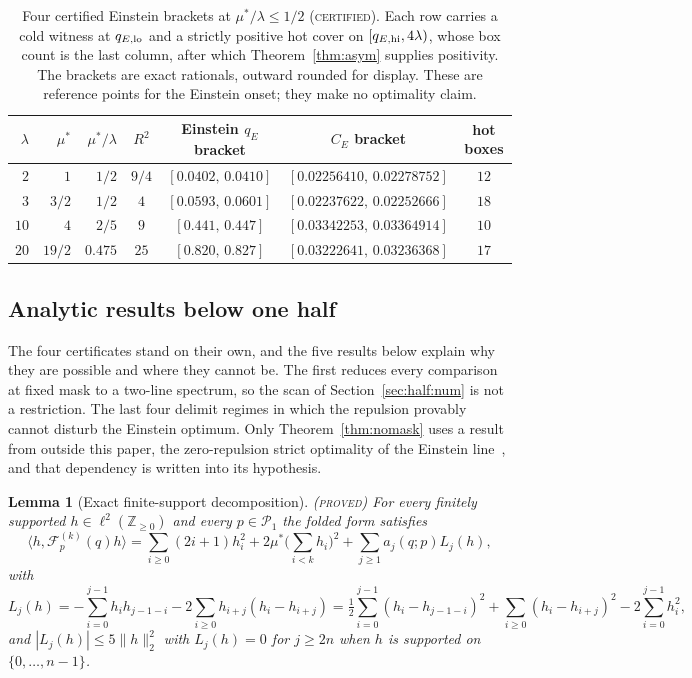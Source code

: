 \documentclass[11pt]{article}
\newcommand{\CE}{C_E}
\newcommand{\Fcal}{\mathcal F}
\newcommand{\muS}{\mu^{*}}
\newtheorem{lemma}[theorem]{Lemma}
\theoremstyle{definition}
\theoremstyle{remark}
\newcommand{\proved}{\textnormal{\textsc{(proved)}}}
\begin{document}
\begin{table}[t]
\centering
\footnotesize
\setlength{\tabcolsep}{5pt}
\renewcommand{\arraystretch}{1.15}
\begin{tabular}{@{}rrrcccc@{}}
\toprule
$\lambda$ & $\muS$ & $\muS/\lambda$ & $R^2$ & Einstein $q_E$ bracket & $\CE$ bracket &
hot boxes\\
\midrule
$2$ & $1$ & $1/2$ & $9/4$ & $[0.0402,\,0.0410]$ & $[0.02256410,\,0.02278752]$ & $12$\\
$3$ & $3/2$ & $1/2$ & $4$ & $[0.0593,\,0.0601]$ & $[0.02237622,\,0.02252666]$ & $18$\\
$10$ & $4$ & $2/5$ & $9$ & $[0.441,\,0.447]$ & $[0.03342253,\,0.03364914]$ & $10$\\
$20$ & $19/2$ & $0.475$ & $25$ & $[0.820,\,0.827]$ & $[0.03222641,\,0.03236368]$ & $17$\\
\bottomrule
\end{tabular}
\caption{Four certified Einstein brackets at $\muS/\lambda\le1/2$ (\textsc{certified}).
Each row carries a cold witness at $q_{E,\rm lo}$ and a strictly positive hot cover on
$[q_{E,\rm hi},4\lambda)$, whose box count is the last column, after which
Theorem~\ref{thm:asym} supplies positivity. The brackets are exact rationals, outward
rounded for display. These are reference points for the Einstein onset; they make no
optimality claim.}
\label{tab:anchors}
\end{table}

\subsection{Analytic results below one half}\label{sec:half:proof}

The four certificates stand on their own, and the five results below explain why they are
possible and where they cannot be. The first reduces every comparison at fixed mask to a
two-line spectrum, so the scan of Section~\ref{sec:half:num} is not a restriction. The
last four delimit regimes in which the repulsion provably cannot disturb the Einstein
optimum. Only Theorem~\ref{thm:nomask} uses a result from outside this paper, the
zero-repulsion strict optimality of the Einstein line~\cite{rens,kondratev}, and that
dependency is written into its hypothesis.

\begin{lemma}[Exact finite-support decomposition]\label{lem:decomp}\proved
For every finitely supported $h\in\ell^2(\mathbb Z_{\ge0})$ and every $p\in\mathcal P_1$
the folded form satisfies
\begin{equation}\label{eq:finite}
\langle h,\Fcal_p^{(k)}(q)h\rangle=\sum_{i\ge0}(2i+1)h_i^2
+2\muS\Big(\sum_{i<k}h_i\Big)^2+\sum_{j\ge1}a_j(q;p)L_j(h),
\end{equation}
with
\begin{equation}\label{eq:Lj}
L_j(h)=-\sum_{i=0}^{j-1}h_ih_{j-1-i}-2\sum_{i\ge0}h_{i+j}(h_i-h_{i+j})
=\tfrac12\sum_{i=0}^{j-1}(h_i-h_{j-1-i})^2+\sum_{i\ge0}(h_i-h_{i+j})^2
-2\sum_{i=0}^{j-1}h_i^2,
\end{equation}
and $|L_j(h)|\le5\|h\|_2^2$ with $L_j(h)=0$ for $j\ge2n$ when $h$ is supported on
$\{0,\dots,n-1\}$.
\end{lemma}
\end{document}

